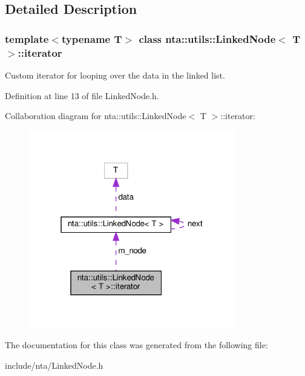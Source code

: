 \subsection{Detailed Description}
\subsubsection*{template$<$typename T$>$\newline
class nta\+::utils\+::\+Linked\+Node$<$ T $>$\+::iterator}

Custom iterator for looping over the data in the linked list. 

Definition at line 13 of file Linked\+Node.\+h.



Collaboration diagram for nta\+:\+:utils\+:\+:Linked\+Node$<$ T $>$\+:\+:iterator\+:
\nopagebreak
\begin{figure}[H]
\begin{center}
\leavevmode
\includegraphics[width=256pt]{da/d2f/classnta_1_1utils_1_1LinkedNode_1_1iterator__coll__graph}
\end{center}
\end{figure}


The documentation for this class was generated from the following file\+:\begin{DoxyCompactItemize}
\item 
include/nta/Linked\+Node.\+h\end{DoxyCompactItemize}
